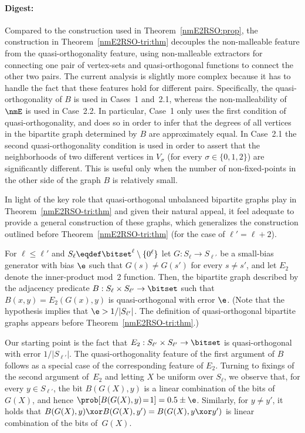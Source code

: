 \paragraph{Digest:}
Compared to the construction used in Theorem~\ref{nmE2RSO:prop},
the construction in Theorem~\ref{nmE2RSO-tri:thm} decouples
the non-malleable feature from the quasi-orthogonality feature,
using non-malleable extractors for connecting one pair of vertex-sets
and quasi-orthogonal functions to connect the other two pairs.
The current analysis is slightly more complex because it has
to handle the fact that these features hold for different pairs.
Specifically, the quasi-orthogonality of $B$ is used in Cases~1 and~2.1,
whereas the non-malleability of $\nmE$ is used in Case~2.2.
In particular, Case~1 only uses the first condition of quasi-orthogonality,
and does so in order to infer that the degrees of all vertices
in the bipartite graph determined by $B$ are approximately equal.
In Case~2.1 the second quasi-orthogonality condition is used
in order to assert that the neighborhoods of two different vertices
in $V_\sigma$ (for every $\sigma\in\{0,1,2\}$) are significantly different.
This is useful only when the number of non-fixed-points
in the other side of the graph $B$ is relatively small.
%
%
%
%

In light of the key role that quasi-orthogonal unbalanced bipartite
graphs play in Theorem~\ref{nmE2RSO-tri:thm} and given their natural appeal,
it feel adequate to provide a general construction of these graphs,
which generalizes the construction outlined before
Theorem~\ref{nmE2RSO-tri:thm} (for the case of $\ell'=\ell+2$).
%
%
%
%


\label{nice-bipartite:prop}
For $\ell\leq\ell'$ and $S_\ell\eqdef\bitset^\ell\setminus\{0^\ell\}$
let $G:S_\ell\to S_{\ell'}$ be a small-bias generator with bias $\e$
such that $G(s)\neq G(s')$ for every $s\neq s'$,
and let $E_2$ denote the inner-product mod~2 function.
Then, the bipartite graph described by
the adjacency predicate $B:S_\ell\times S_{\ell'}\to\bitset$
such that $B(x,y)=E_2(G(x),y)$ is quasi-orthogonal
with error $\e$.
%
\EP
(Note that the hypothesis implies that $\e>1/|S_{\ell'}|$.
The definition of quasi-orthogonal bipartite graphs
appears before Theorem~\ref{nmE2RSO-tri:thm}.)
\medskip

\BPFS
Our starting point is the fact
that $E_2:S_{\ell'}\times S_{\ell'}\to\bitset$
is quasi-orthogonal with error $1/|S_{\ell'}|$.
The quasi-orthogonality feature of the first argument of $B$
follows as a special case of the corresponding feature of $E_2$.
Turning to fixings of the second argument of~$E_2$
and letting $X$ be uniform over $S_\ell$,
we observe that, for every $y\in S_{\ell'}$,
the bit $B(G(X),y)$ is a linear combination of the bits of $G(X)$,
and hence $\prob[B(G(X),y)\!=\!1]=0.5\pm\e$.
Similarly, for $y\neq y'$, it holds
that $B(G(X),y)\xor B(G(X),y')=B(G(X),y\xor y')$
is linear combination of the bits of~$G(X)$.
\EPFS


